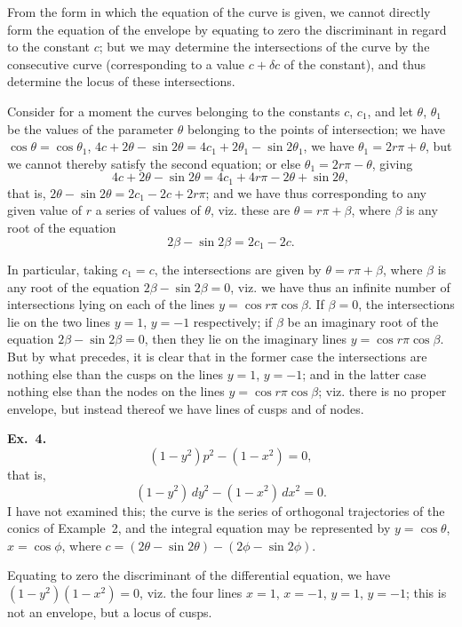 \documentclass[11pt,a4paper]{book}
\begin{document}
From the form in which the equation of the curve is given, we cannot directly form the equation of the envelope by equating to zero the discriminant in regard to the constant $c$; but we may determine the intersections of the curve by the consecutive curve (corresponding to a value $c + \delta c$ of the constant), and thus determine the locus of these intersections.

Consider for a moment the curves belonging to the constants $c$, $c_1$, and let $\theta$, $\theta_1$ be the values of the parameter $\theta$ belonging to the points of intersection; we have $\cos\theta = \cos\theta_1$, $4c + 2\theta - \sin 2\theta = 4c_1 + 2\theta_1 - \sin 2\theta_1$, we have $\theta_1 = 2r\pi + \theta$, but we cannot thereby satisfy the second equation; or else $\theta_1 = 2r\pi - \theta$, giving
\[
4c + 2\theta - \sin 2\theta = 4c_1 + 4r\pi - 2\theta + \sin 2\theta,
\]
that is, $2\theta - \sin 2\theta = 2c_1 - 2c + 2r\pi$; and we have thus corresponding to any given value of $r$ a series of values of $\theta$, viz. these are $\theta = r\pi + \beta$, where $\beta$ is any root of the equation
\[
2\beta - \sin 2\beta = 2c_1 - 2c.
\]

In particular, taking $c_1 = c$, the intersections are given by $\theta = r\pi + \beta$, where $\beta$ is any root of the equation $2\beta - \sin 2\beta = 0$, viz. we have thus an infinite number of intersections lying on each of the lines $y = \cos r\pi \cos\beta$. If $\beta = 0$, the intersections lie on the two lines $y = 1$, $y = -1$ respectively; if $\beta$ be an imaginary root of the equation $2\beta - \sin 2\beta = 0$, then they lie on the imaginary lines $y = \cos r\pi \cos\beta$. But by what precedes, it is clear that in the former case the intersections are nothing else than the cusps on the lines $y = 1$, $y = -1$; and in the latter case nothing else than the nodes on the lines $y = \cos r\pi \cos\beta$; viz. there is no proper envelope, but instead thereof we have lines of cusps and of nodes.

\medskip\noindent\textbf{Ex.~4.}
\[
(1-y^2)p^2 - (1-x^2) = 0,
\]
that is,
\[
(1-y^2)\, dy^2 - (1-x^2)\, dx^2 = 0.
\]
I have not examined this; the curve is the series of orthogonal trajectories of the conics of Example~2, and the integral equation may be represented by $y = \cos\theta$, $x = \cos\phi$, where $c = (2\theta - \sin 2\theta) - (2\phi - \sin 2\phi)$.

Equating to zero the discriminant of the differential equation, we have $(1-y^2)(1-x^2) = 0$, viz. the four lines $x = 1$, $x = -1$, $y = 1$, $y = -1$; this is not an envelope, but a locus of cusps.
\end{document}
